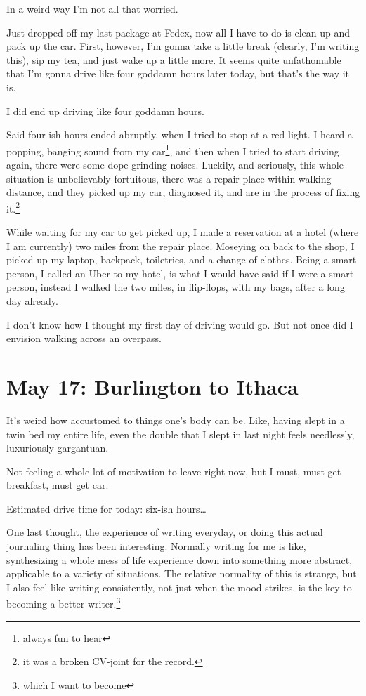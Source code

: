 \documentclass[../butidigress.tex]{subfiles}
\begin{document}
In a weird way I'm not all that worried.

\entryskip

Just dropped off my last package at Fedex, now all I have to do is clean up and pack up the car.
First, however, I'm gonna take a little break (clearly, I'm writing this), sip my tea, and just wake up a little more.
It seems quite unfathomable that I'm gonna drive like four goddamn hours later today, but that's the way it is.

\entryskip

I did end up driving like four goddamn hours.

Said four-ish hours ended abruptly, when I tried to stop at a red light.
I heard a popping, banging sound from my car\footnote{always fun to hear}, and then when I tried to start driving again, there were some dope grinding noises.
Luckily, and seriously, this whole situation is unbelievably fortuitous, there was a repair place within walking distance, and they picked up my car, diagnosed it, and are in the process of fixing it.\footnote{it was a broken CV-joint for the record.}

While waiting for my car to get picked up, I made a reservation at a hotel (where I am currently) two miles from the repair place.
Moseying on back to the shop, I picked up my laptop, backpack, toiletries, and a change of clothes.
Being a smart person, I called an Uber to my hotel, is what I would have said if I were a smart person, instead I walked the two miles, in flip-flops, with my bags, after a long day already.

I don't know how I thought my first day of driving would go.
But not once did I envision walking across an overpass.

\section{May 17: Burlington to Ithaca}
It's weird how accustomed to things one's body can be.
Like, having slept in a twin bed my entire life, even the double that I slept in last night feels needlessly, luxuriously gargantuan.

Not feeling a whole lot of motivation to leave right now, but I must, must get breakfast, must get car.

Estimated drive time for today: six-ish hours\ldots

One last thought, the experience of writing everyday, or doing this actual journaling thing has been interesting.
Normally writing for me is like, synthesizing a whole mess of life experience down into something more abstract, applicable to a variety of situations.
The relative normality of this is strange, but I also feel like writing consistently, not just when the mood strikes, is the key to becoming a better writer.\footnote{which I want to become}
\end{document}
